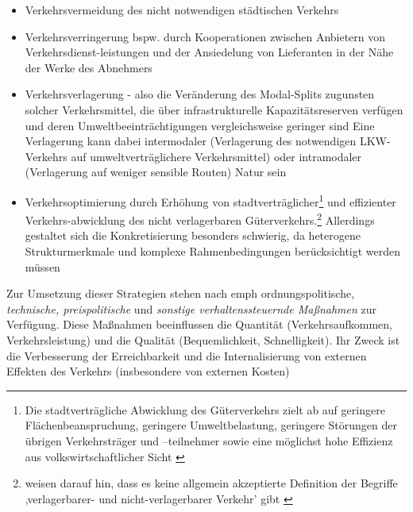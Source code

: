 \begin{itemize}
%
   \item Verkehrsvermeidung des nicht notwendigen städtischen Verkehrs  \autocites[][]{bib.876} \autocites[][]{bib.562}
\label{_Toc347467544}
   \item Verkehrsverringerung bspw. durch Kooperationen zwischen Anbietern von Verkehrsdienst-leistungen und der Ansiedelung von Lieferanten in der Nähe der Werke des Abnehmers  \autocites[][]{bib.562}
\label{_Toc347467545}
   \item Verkehrsverlagerung - also die Veränderung des Modal-Splits zugunsten solcher Verkehrsmittel, die über infrastrukturelle Kapazitätsreserven verfügen und deren Umweltbeeinträchtigungen vergleichsweise geringer sind  \autocites[][]{bib.739} Eine Verlagerung kann dabei intermodaler (Verlagerung des notwendigen LKW-Verkehrs auf umweltverträglichere Verkehrsmittel) oder intramodaler (Verlagerung auf weniger sensible Routen) Natur sein 
\label{_Toc347467546} \autocites[][]{bib.876} \autocites[][]{bib.562}
   \item Verkehrsoptimierung durch Erhöhung von stadtverträglicher\footnote{%
 Die stadtverträgliche Abwicklung des Güterverkehrs zielt ab auf geringere Flächenbeanspruchung, geringere Umweltbelastung, geringere Störungen der übrigen Verkehrsträger und –teilnehmer sowie eine möglichst hohe Effizienz aus volkswirtschaftlicher Sicht  \autocites[][]{bib.876}
}%
 und effizienter Verkehrs-abwicklung des nicht verlagerbaren Güterverkehrs.\footnote{%
  \citeauthor{bib.876} weisen darauf hin, dass es keine allgemein akzeptierte Definition der Begriffe ‚verlagerbarer- und nicht-verlagerbarer Verkehr’ gibt  \autocites[][]{bib.876}
}%
 Allerdings gestaltet sich die Konkretisierung besonders schwierig, da heterogene Strukturmerkmale und komplexe Rahmenbedingungen berücksichtigt werden müssen  \autocites[][]{bib.876}
%
\end{itemize}
Zur Umsetzung dieser Strategien stehen nach  \citeauthor{bib.248} emph{ ordnungspolitische},\emph{ technische, preispolitische} und \emph{sonstige verhaltenssteuernde Maßnahmen} zur Verfügung. \glqq Diese Maßnahmen beeinflussen die Quantität (Verkehrsaufkommen, Verkehrsleistung) und die Qualität (Bequemlichkeit, Schnelligkeit). Ihr Zweck ist die Verbesserung der Erreichbarkeit und die Internalisierung von externen Effekten des Verkehrs (insbesondere von externen Kosten)\grqq   \autocites[][]{bib.248} ~\\

